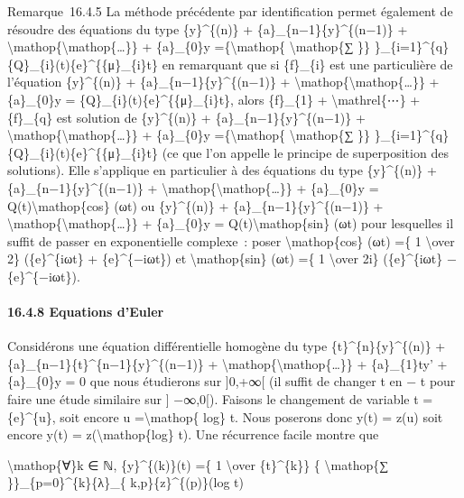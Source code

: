 \documentclass[]{article}
\begin{document}
Remarque~16.4.5 La méthode précédente par identification permet
également de résoudre des équations du type \{y\}\^{}\{(n)\} +
\{a\}\_\{n−1\}\{y\}\^{}\{(n−1)\} +
\textbackslash{}mathop\{\textbackslash{}mathop\{\ldots{}\}\} +
\{a\}\_\{0\}y =\{\textbackslash{}mathop\{ \textbackslash{}mathop\{∑ \}\}
\}\_\{i=1\}\^{}\{q\}\{Q\}\_\{i\}(t)\{e\}\^{}\{\{μ\}\_\{i\}t\} en
remarquant que si \{f\}\_\{i\} est une particulière de l'équation
\{y\}\^{}\{(n)\} + \{a\}\_\{n−1\}\{y\}\^{}\{(n−1)\} +
\textbackslash{}mathop\{\textbackslash{}mathop\{\ldots{}\}\} +
\{a\}\_\{0\}y = \{Q\}\_\{i\}(t)\{e\}\^{}\{\{μ\}\_\{i\}t\}, alors
\{f\}\_\{1\} + \textbackslash{}mathrel\{⋯\} + \{f\}\_\{q\} est solution
de \{y\}\^{}\{(n)\} + \{a\}\_\{n−1\}\{y\}\^{}\{(n−1)\} +
\textbackslash{}mathop\{\textbackslash{}mathop\{\ldots{}\}\} +
\{a\}\_\{0\}y =\{\textbackslash{}mathop\{ \textbackslash{}mathop\{∑ \}\}
\}\_\{i=1\}\^{}\{q\}\{Q\}\_\{i\}(t)\{e\}\^{}\{\{μ\}\_\{i\}t\} (ce que
l'on appelle le principe de superposition des solutions). Elle
s'applique en particulier à des équations du type \{y\}\^{}\{(n)\} +
\{a\}\_\{n−1\}\{y\}\^{}\{(n−1)\} +
\textbackslash{}mathop\{\textbackslash{}mathop\{\ldots{}\}\} +
\{a\}\_\{0\}y = Q(t)\textbackslash{}mathop\{cos\} (ωt) ou
\{y\}\^{}\{(n)\} + \{a\}\_\{n−1\}\{y\}\^{}\{(n−1)\} +
\textbackslash{}mathop\{\textbackslash{}mathop\{\ldots{}\}\} +
\{a\}\_\{0\}y = Q(t)\textbackslash{}mathop\{sin\} (ωt) pour lesquelles
il suffit de passer en exponentielle complexe~: poser
\textbackslash{}mathop\{cos\} (ωt) =\{ 1 \textbackslash{}over 2\}
(\{e\}\^{}\{iωt\} + \{e\}\^{}\{−iωt\}) et \textbackslash{}mathop\{sin\}
(ωt) =\{ 1 \textbackslash{}over 2i\} (\{e\}\^{}\{iωt\} −
\{e\}\^{}\{−iωt\}).

\paragraph{16.4.8 Equations d'Euler}

Considérons une équation différentielle homogène du type
\{t\}\^{}\{n\}\{y\}\^{}\{(n)\} +
\{a\}\_\{n−1\}\{t\}\^{}\{n−1\}\{y\}\^{}\{(n−1)\} +
\textbackslash{}mathop\{\textbackslash{}mathop\{\ldots{}\}\} +
\{a\}\_\{1\}ty' + \{a\}\_\{0\}y = 0 que nous étudierons sur {]}0,+∞{[}
(il suffit de changer t en − t pour faire une étude similaire sur {]}
−∞,0{[}). Faisons le changement de variable t = \{e\}\^{}\{u\}, soit
encore u =\textbackslash{}mathop\{ log\} t. Nous poserons donc y(t) =
z(u) soit encore y(t) = z(\textbackslash{}mathop\{log\} t). Une
récurrence facile montre que

\textbackslash{}mathop\{∀\}k ∈ ℕ, \{y\}\^{}\{(k)\}(t) =\{ 1
\textbackslash{}over \{t\}\^{}\{k\}\} \{ \textbackslash{}mathop\{∑
\}\}\_\{p=0\}\^{}\{k\}\{λ\}\_\{ k,p\}\{z\}\^{}\{(p)\}(log t)
\end{document}
